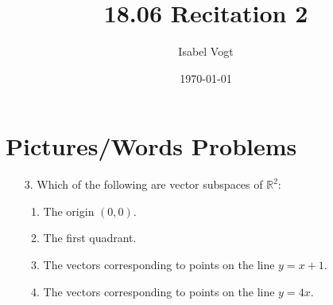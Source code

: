 \documentclass[11pt]{article}
\title{18.06 Recitation 2}
\author{Isabel Vogt}
\date{\today}                                           %
\newcommand{\rr}{\mathbb{R}}
\begin{document}
\maketitle
\section{Pictures/Words Problems}

\begin{enumerate}


\item[3.] Which of the following are vector subspaces of $\rr^2$:

\begin{enumerate}

\item The origin $(0,0)$.
\item The first quadrant.
\item The vectors corresponding to points on the line $y = x + 1$.
\item The vectors corresponding to points on the line $y = 4x$.


\end{enumerate}
\end{enumerate}
\end{document}
